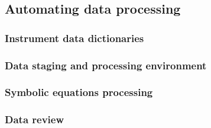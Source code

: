 \subsection{Automating data processing}

\subsubsection{Instrument data dictionaries}

\subsubsection{Data staging and processing environment}

\subsubsection{Symbolic equations processing}

\subsubsection{Data review}
